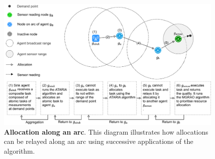 \begin{figure}[ht]
	\centering
	\includegraphics[width=0.8\linewidth]{arc-flow}
	\caption{\textbf{Allocation along an arc}. This diagram illustrates how allocations can be relayed along an arc using successive applications of the \acronymATARIA{}{} algorithm.}
	\label{fig:arc-flow}
\end{figure}

